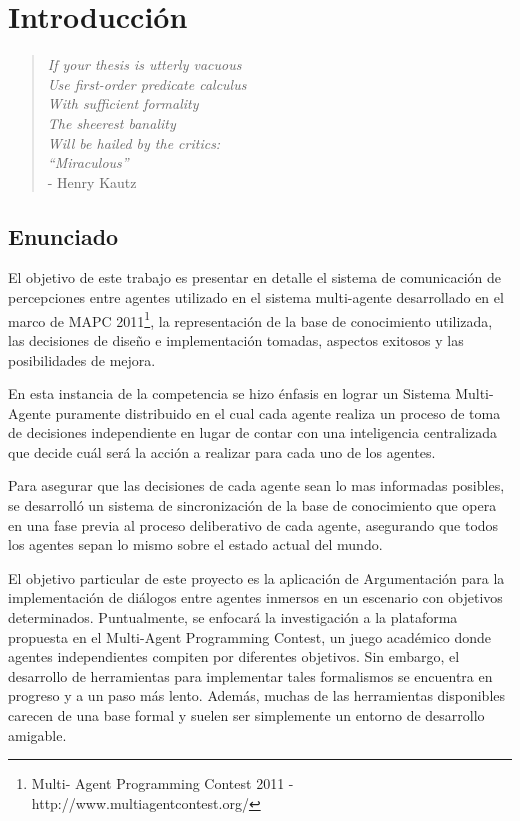 \chapter{Introducción}
\label{chap:introduccion}

\begin{quote}
\scriptsize{
    \emph{
        If your thesis is utterly vacuous   \\
        Use first-order predicate calculus  \\
            With sufficient formality       \\
            The sheerest banality           \\
        Will be hailed by the critics:      \\
            ``Miraculous''                  \\
        }
    - Henry Kautz
}
\end{quote}

\section{Enunciado}
\label{sec:enunciado}

  El objetivo de este trabajo es presentar en detalle el sistema de
  comunicación de percepciones entre agentes utilizado en el sistema
  multi-agente desarrollado en el marco de MAPC 2011\footnote{Multi-
  Agent Programming Contest 2011 - http://www.multiagentcontest.org/},
  la representación de la base de conocimiento utilizada, las decisiones
  de diseño e implementación tomadas, aspectos exitosos y las
  posibilidades de mejora.
  
  En esta instancia de la competencia se hizo énfasis en lograr un
  Sistema Multi-Agente puramente distribuido en el cual cada agente
  realiza un proceso de toma de decisiones independiente en lugar de
  contar con una inteligencia centralizada que decide cuál será la
  acción a realizar para cada uno de los agentes. 
  
  Para asegurar que las decisiones de cada agente sean lo mas informadas
  posibles, se desarrolló un sistema de sincronización de la base de
  conocimiento que opera en una fase previa al proceso deliberativo de
  cada agente, asegurando que todos los agentes sepan lo mismo sobre el
  estado actual del mundo.
  
  El objetivo particular de este proyecto es la aplicación de
  Argumentación para la implementación de diálogos entre agentes
  inmersos en un escenario con objetivos determinados.
  Puntualmente, se enfocará la investigación a la plataforma propuesta
  en el Multi-Agent Programming Contest, un juego académico donde
  agentes independientes compiten por diferentes objetivos.
  Sin embargo, el desarrollo de herramientas para implementar tales
  formalismos se encuentra en progreso y a un paso más lento.
  Además, muchas de las herramientas disponibles carecen de una base
  formal y suelen ser simplemente un entorno de desarrollo amigable.

